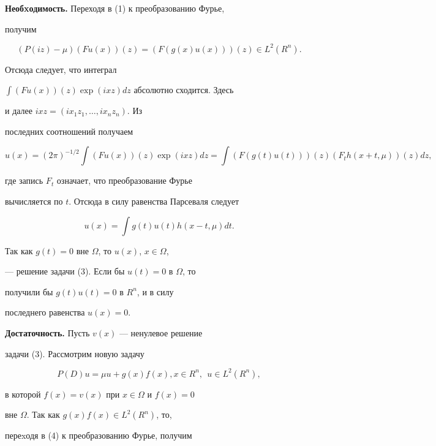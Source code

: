 \begin{pf}


{\bf Необxодимость.} Переходя в (1) к преобразованию Фурье,


получим


$$


(P(iz)-\mu )(Fu(x))(z) = (F(g(x)u(x)))(z)


\in L^{2}{(R^{n})}.


$$


Отсюда следует, что интеграл


$\int (Fu(x))(z) \exp(ixz) dz$ абсолютно сходится. Здесь


и далее $ixz= (ix_{1}z_{1},\dotsc,ix_{n}z_{n})$. Из


последних соотношений получаем


$$


u(x) = (2\pi)^{-1/2} \int (Fu(x))(z) \exp(ixz) dz= 


\int (F(g(t)u(t)))(z) (F_{t} h(x+t,\mu ))(z) dz,


$$


где запись $F_{t}$ означает, что преобразование Фурье


вычисляется по $t$. Отсюда в силу равенства Парсеваля следует


$$


u(x) = \int g(t) u(t) h(x-t,\mu) dt.


$$


Так как $ g(t)=0$ вне $\Omega$, то $u(x)$, $x \in \Omega$,


--- решение задачи (3). Если бы $u(t)=0$ в $\Omega$, то


получили бы $g(t)u(t)=0$ в $R^{n}$, и в силу


последнего равенства $ u(x)=0$.





{\bf Достаточность.} Пусть $v(x)$ --- ненулевое решение


задачи (3). Рассмотрим новую задачу


\begin{equation}


P(D)u= \mu u + g(x)f(x),x \in R^{n},\ \ u \in L^{2}{(R^{n})},


\end{equation}


в которой $f(x)=v(x)$ при $x \in \Omega$ и $f(x)=0$


вне $\Omega$. Так как $g(x)f(x) \in L^{2}{(R^{n})}$, то,


переxодя в (4) к преобразованию Фурье, получим



\end{pf}
